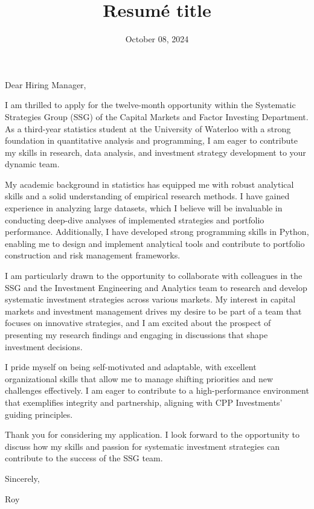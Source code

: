 \documentclass[11pt,a4paper,roman]{moderncv}        %
\title{Resumé title}                               %
\date{October 08, 2024}                              %
\begin{document}
\recipient{\phantom{1}}{}
\opening{\phantom{1}}
\closing{\phantom{1}}
\enclosure[\phantom{1}]{\phantom{1}}          %
\makelettertitle

Dear Hiring Manager,

I am thrilled to apply for the twelve-month opportunity within the Systematic Strategies Group (SSG) of the Capital Markets and Factor Investing Department. As a third-year statistics student at the University of Waterloo with a strong foundation in quantitative analysis and programming, I am eager to contribute my skills in research, data analysis, and investment strategy development to your dynamic team.

My academic background in statistics has equipped me with robust analytical skills and a solid understanding of empirical research methods. I have gained experience in analyzing large datasets, which I believe will be invaluable in conducting deep-dive analyses of implemented strategies and portfolio performance. Additionally, I have developed strong programming skills in Python, enabling me to design and implement analytical tools and contribute to portfolio construction and risk management frameworks.

I am particularly drawn to the opportunity to collaborate with colleagues in the SSG and the Investment Engineering and Analytics team to research and develop systematic investment strategies across various markets. My interest in capital markets and investment management drives my desire to be part of a team that focuses on innovative strategies, and I am excited about the prospect of presenting my research findings and engaging in discussions that shape investment decisions.

I pride myself on being self-motivated and adaptable, with excellent organizational skills that allow me to manage shifting priorities and new challenges effectively. I am eager to contribute to a high-performance environment that exemplifies integrity and partnership, aligning with CPP Investments' guiding principles.

Thank you for considering my application. I look forward to the opportunity to discuss how my skills and passion for systematic investment strategies can contribute to the success of the SSG team.

Sincerely,

Roy

\vspace{0.5cm}
\end{document}
